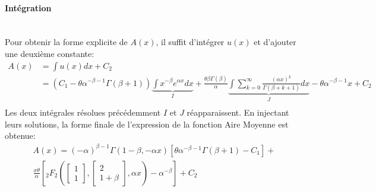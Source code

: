\paragraph{Intégration}\phantom{}\\
Pour obtenir la forme explicite de $A(x)$, il suffit d'intégrer $u(x)$ et d'ajouter une deuxième constante:
\[
\begin{aligned}
    A(x) &= \int u(x)dx+C_2 \\
    &= (C_1-\theta\alpha^{-\beta-1}\Gamma(\beta+1))\underbrace{\int x^{-\beta}e^{\alpha x}dx}_I +\frac{\theta\beta\Gamma(\beta)}{\alpha}\underbrace{\int\sum_{k=0}^{\infty} \frac{{(\alpha x)}^k}{\Gamma(\beta+k+1)}dx}_J-\theta\alpha^{-\beta-1}x +C_2 \\
\end{aligned}
\]
Les deux intégrales résolues précédemment $I$ et $J$ réapparaissent. En injectant leurs solutions, la forme finale de l'expression de la fonction Aire Moyenne est obtenue: 
\begin{equation}\label{sol_area}
    \begin{aligned}
            A(x) = {(-\alpha)}^{\beta-1}\Gamma(1-\beta,-\alpha x)[\theta\alpha^{-\beta-1}\Gamma(\beta+1)-C_1]+ \\ \frac{x\theta}{\alpha}\left[{}_2F_2\left(\begin{bmatrix}1\\1\end{bmatrix},\begin{bmatrix}2\\1+\beta\end{bmatrix},\alpha x\right)-\alpha^{-\beta}\right] +C_2 
    \end{aligned}
\end{equation}


